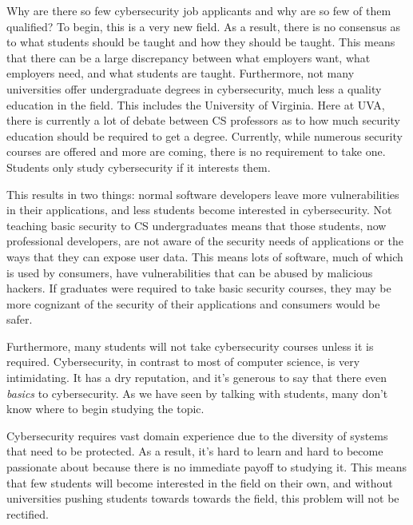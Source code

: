 \documentclass[openright]{report}
\begin{document}
\par Why are there so few cybersecurity job applicants and why are so few of them qualified? To begin, this is a very new field. As a result, there is no consensus as to what students should be taught and how they should be taught\cite{why_no_cyber_classes}. This means that there can be a large discrepancy between what employers want, what employers need, and what students are taught. Furthermore, not many universities offer undergraduate degrees in cybersecurity, much less a quality education in the field. This includes the University of Virginia. Here at UVA, there is currently a lot of debate between CS professors as to how much security education should be required to get a degree. Currently, while numerous security courses are offered and more are coming, there is no requirement to take one\cite{comsci_handbook}. Students only study cybersecurity if it interests them.

\par This results in two things: normal software developers leave more vulnerabilities in their applications, and less students become interested in cybersecurity. Not teaching basic security to CS undergraduates means that those students, now professional developers, are not aware of the security needs of applications or the ways that they can expose user data. This means lots of software, much of which is used by consumers, have vulnerabilities that can be abused by malicious hackers\cite{why_no_cyber_classes}. If graduates were required to take basic security courses, they may be more cognizant of the security of their applications and consumers would be safer.

\par Furthermore, many students will not take cybersecurity courses unless it is required. Cybersecurity, in contrast to most of computer science, is very intimidating. It has a dry reputation, and it's generous to say that there even \textit{basics} to cybersecurity. As we have seen by talking with students, many don't know where to begin studying the topic. 

\par Cybersecurity requires vast domain experience due to the diversity of systems that need to be protected. As a result, it's hard to learn and hard to become passionate about because there is no immediate payoff to studying it. This means that few students will become interested in the field on their own, and without universities pushing students towards towards the field, this problem will not be rectified.
\end{document}
